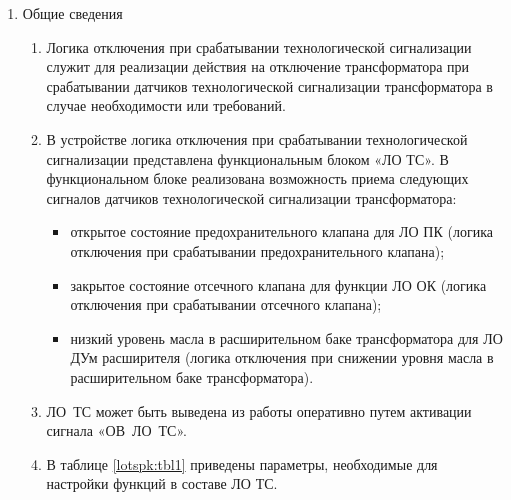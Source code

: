 
\color{black}

\begin{enumerate}

\item Общие сведения

\begin{enumerate}

\item
Логика отключения при срабатывании технологической сигнализации служит для реализации действия на отключение трансформатора при срабатывании датчиков технологической сигнализации трансформатора в случае необходимости или требований.

\item
В устройстве логика отключения при срабатывании технологической сигнализации представлена функциональным блоком «ЛО ТС». В функциональном блоке реализована возможность приема следующих сигналов датчиков технологической сигнализации трансформатора:
\begin{itemize}
\item открытое состояние предохранительного клапана для ЛО ПК (логика отключения при срабатывании предохранительного клапана);
\item закрытое состояние отсечного клапана для функции ЛО ОК (логика отключения при срабатывании отсечного клапана);
\item низкий уровень масла в расширительном баке трансформатора для ЛО ДУм расширителя (логика отключения при снижении уровня масла в расширительном баке трансформатора).
\end{itemize}

\item
ЛО~ТС может быть выведена из работы оперативно путем активации сигнала «ОВ~ЛО~ТС».
\item
В таблице \ref{lotspk:tbl1} приведены параметры, необходимые для настройки функций в составе ЛО ТС.

\end{enumerate}


\end{enumerate}

